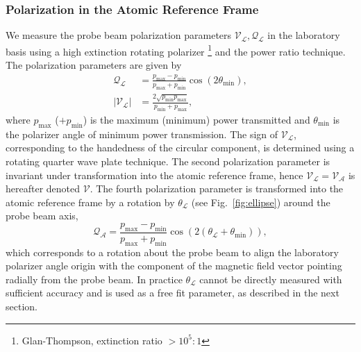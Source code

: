 \subsubsection{Polarization in the Atomic Reference Frame}
	 We measure the probe beam polarization parameters \(\mathcal{V_{L}},\mathcal{Q_{L}}\) in the laboratory basis using a high extinction rotating polarizer \footnote{Glan-Thompson, extinction ratio $>10^{5}:1$} and the power ratio technique. The polarization parameters are given by
	 \begin{align}
	     \mathcal{Q_{L}} &=\frac{p_{\mathrm{max}}-p_{\mathrm{min}}}{p_{\mathrm{max}}+p_{\mathrm{min}}} \cos(2\theta_{\mathrm{min}}), \\
	     |\mathcal{V}_{\mathcal{L}}| &= \frac{2\sqrt{p_{\mathrm{min}}p_{\mathrm{max}}}}{p_{\mathrm{min}}+p_{\mathrm{max}}},
	\end{align}
	where \(p_{\mathrm{max}}\) (\(+p_{\mathrm{min}}\)) is the maximum (minimum) power transmitted and $\theta_{\mathrm{min}}$ is the polarizer angle of minimum power transmission. The sign of \(\mathcal{V}_{\mathcal{L}}\), corresponding to the handedness of the circular component, is determined using a rotating quarter wave plate technique. The second polarization parameter is invariant under transformation into the atomic reference frame, hence \(\mathcal{V_{L}}=\mathcal{V_{A}}\) is hereafter denoted \(\mathcal{V}\). The fourth polarization parameter is transformed into the atomic reference frame by a rotation by \(\mathcal{\theta_{L}}\) (see Fig.~\ref{fig:ellipse}) around the probe beam axis,
	\begin{equation}
	 \mathcal{Q_{A}} =\frac{p_{\mathrm{max}}-p_{\mathrm{min}}}{p_{\mathrm{max}}+p_{\mathrm{min}}} \cos(2(\mathcal{\theta_{L}}+\theta_{\mathrm{min}})) ,
	\end{equation}
	which corresponds to a rotation about the probe beam to align the laboratory polarizer angle origin with the component of the magnetic field vector pointing radially from the probe beam. In practice \(\mathcal{\theta_{L}}\) cannot be directly measured with sufficient accuracy and is used as a free fit parameter, as described in the next section.
	 
